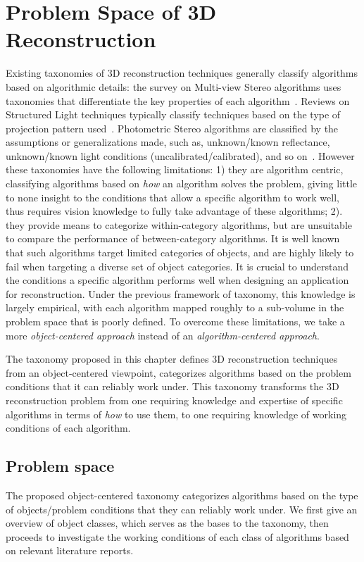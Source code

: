 
\chapter{Problem Space of 3D Reconstruction}
\label{ch:3DRecon_Taxo}
Existing taxonomies of 3D reconstruction techniques generally classify algorithms based on algorithmic details: the survey on Multi-view Stereo algorithms uses taxonomies that differentiate the key properties of each algorithm~\cite{seitz2006comparison}. Reviews on Structured Light techniques typically classify techniques based on the type of projection pattern used~\cite{geng2011structured, salvi2004pattern}. Photometric Stereo algorithms are classified by the assumptions or generalizations made, such as, unknown/known reflectance, unknown/known light conditions (uncalibrated/calibrated), and so on~\cite{shi2016benchmark}.
However these taxonomies have the following limitations: 1) they are algorithm centric, classifying algorithms based on \textit{how} an algorithm solves the problem, giving little to none insight to the conditions that allow a specific algorithm to work well, thus requires vision knowledge to fully take advantage of these algorithms; 2). they provide means to categorize within-category algorithms, but are unsuitable to compare the performance of between-category algorithms. It is well known that such algorithms target limited categories of objects, and are highly likely to fail when targeting a diverse set of object categories. It is crucial to understand the conditions a specific algorithm performs well when designing an application for reconstruction. Under the previous framework of taxonomy, this knowledge is largely empirical, with each algorithm mapped roughly to a sub-volume in the problem space that is poorly defined. To overcome these limitations, we take a more \textit{object-centered approach} instead of an \textit{algorithm-centered approach}.

The taxonomy proposed in this chapter defines 3D reconstruction techniques from an object-centered viewpoint, \ie categorizes algorithms based on the problem conditions that it can reliably work under. This taxonomy transforms the 3D reconstruction problem from one requiring knowledge and expertise of specific algorithms in terms of \textit{how} to use them, to one requiring knowledge of working conditions of each algorithm.

\section{Problem space}
The proposed object-centered taxonomy categorizes algorithms based on the type of objects/problem conditions that they can reliably work under. We first give an overview of object classes, which serves as the bases to the taxonomy, then proceeds to investigate the working conditions of each class of algorithms based on relevant literature reports.

